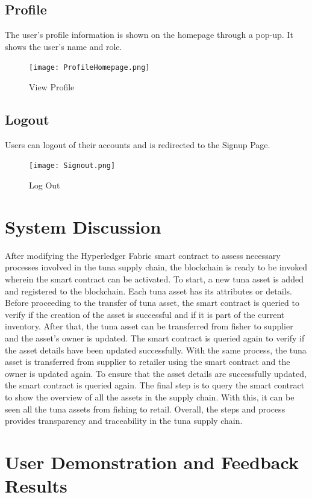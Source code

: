 \subsection{Profile}
The user's profile information is shown on the homepage through a pop-up. It shows the user's name and role.

\begin{figure}[H]
	\centering
	\texttt{[image: ProfileHomepage.png]}
	\caption{View Profile}
	\label{fig:view_profile}
\end{figure}

\subsection{Logout}
Users can logout of their accounts and is redirected to the Signup Page.

\begin{figure}[H]
	\centering
	\texttt{[image: Signout.png]}
	\caption{Log Out}
	\label{fig:signout}
\end{figure} 

\section{System Discussion}
After modifying the Hyperledger Fabric smart contract to assess necessary processes involved in the tuna supply chain, the blockchain is ready to be invoked wherein the smart contract can be activated. To start, a new tuna asset is added and registered to the blockchain. Each tuna asset has its attributes or details. Before proceeding to the transfer of tuna asset, the smart contract is queried to verify if the creation of the asset is successful and if it is part of the current inventory. After that, the tuna asset can be transferred from fisher to supplier and the asset's owner is updated. The smart contract is queried again to verify if the asset details have been updated successfully. With the same process, the tuna asset is transferred from supplier to retailer using the smart contract and the owner is updated again. To ensure that the asset details are successfully updated, the smart contract is queried again. The final step is to query the smart contract to show the overview of all the assets in the supply chain. With this, it can be seen all the tuna assets from fishing to retail. Overall, the steps and process provides transparency and traceability in the tuna supply chain.

\section{User Demonstration and Feedback Results}
